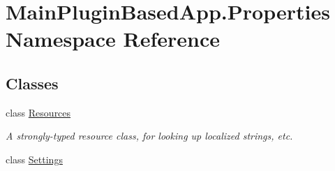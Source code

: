 \hypertarget{namespace_main_plugin_based_app_1_1_properties}{}\section{Main\+Plugin\+Based\+App.\+Properties Namespace Reference}
\label{namespace_main_plugin_based_app_1_1_properties}
\subsection*{Classes}
\begin{DoxyCompactItemize}
\item 
class \mbox{\hyperlink{class_main_plugin_based_app_1_1_properties_1_1_resources}{Resources}}
\begin{DoxyCompactList}\small\item\em A strongly-\/typed resource class, for looking up localized strings, etc. \end{DoxyCompactList}\item 
class \mbox{\hyperlink{class_main_plugin_based_app_1_1_properties_1_1_settings}{Settings}}
\end{DoxyCompactItemize}

